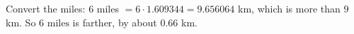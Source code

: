 Convert the miles: $6$ miles $=6\cdot1.609344=9.656064$ km, which is more than $9$ km. So $\boxed{6\text{ miles}}$ is farther, by about $0.66$ km.

